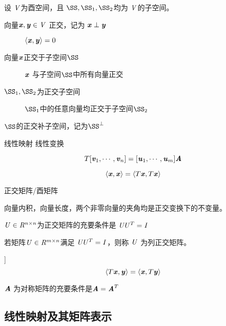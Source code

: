 \begin{definition}
    设 $\SV$为酉空间，且 $\SS, \SS_1, \SS_2$均为 $\SV$的子空间。
    \begin{description}
        \item[向量$\Vx, \Vy \in \SV$ 正交，记为 $\Vx \perp \Vy$] $\langle \Vx, \Vy \rangle = 0$
        \item[向量$\Vx$正交于子空间$\SS$] $\Vx$ 与子空间$\SS$中所有向量正交
        \item[$\SS_1, \SS_2$为正交子空间] $\SS_1$中的任意向量均正交于子空间$\SS_2$
        \item[$\SS$的正交补子空间，记为$\SS^{\perp}$]
    \end{description}
\end{definition}

\begin{definition}
    线性映射
    线性变换

    \[
        T[\Vv_1, \cdots, \Vv_n] = [\Vu_1, \cdots, \Vu_m] \MA
    \]
\end{definition}

\begin{definition}
    \[
        \langle \Vx, \Vx \rangle = \langle T \Vx, T \Vx \rangle
    \]

正交矩阵/酉矩阵

    向量内积，向量长度，两个非零向量的夹角均是正交变换下的不变量。

    $\SU \in \SR^{n \times n}$为正交矩阵的充要条件是 $\SU \SU^T = \SI$

        若矩阵$\SU \in \SR^{m \times n}$满足 $\SU \SU^T = \SI$，则称 $\SU$ 为列正交矩阵。

\end{definition}

\begin{definition}]
    \[
        \langle T\Vx, \Vy \rangle = \langle \Vx , T \Vy \rangle
    \]

$\MA$ 为对称矩阵的充要条件是$\MA = \MA^T$
\end{definition}

\subsection{线性映射及其矩阵表示}
\label{sub:线性映射及其矩阵表示}

\begin{definition}
\end{definition}

\begin{definition}
\end{definition}

